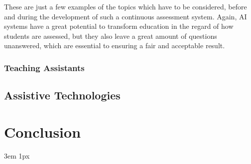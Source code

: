 \documentclass{Academic}
\begin{document}
    These are just a few examples of the topics which have to be considered, before and during the development of such a continuous assessment system. Again, AI systems have a great potential to transform education in the regard of how students are assessed, but they also leave a great amount of questions unanswered, which are essential to ensuring a fair and acceptable result.

    \subsubsection{Teaching Assistants}

    \subsection{Assistive Technologies}

    \section{Conclusion}

    \singlespacing
    \emergencystretch 3em
    \hfuzz 1px
    \printbibliography[heading=bibnumbered]




\end{document}
